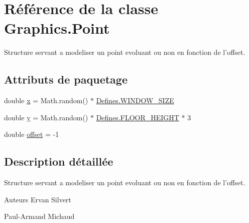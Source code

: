 \hypertarget{classGraphics_1_1Point}{\section{Référence de la classe Graphics.\-Point}
\label{classGraphics_1_1Point}
}


Structure servant a modeliser un point evoluant ou non en fonction de l'offset.  


\subsection*{Attributs de paquetage}
\begin{DoxyCompactItemize}
\item 
double \hyperlink{classGraphics_1_1Point_a58d7632eb589af219c6c4bf7c2178bd3}{x} = Math.\-random() $\ast$ \hyperlink{classDefines_aafb660e1c1534aec4d2cee6cfe57029f}{Defines.\-W\-I\-N\-D\-O\-W\-\_\-\-S\-I\-Z\-E}
\item 
double \hyperlink{classGraphics_1_1Point_abadff6ba5989616e892517ebb421440a}{y} = Math.\-random() $\ast$ \hyperlink{classDefines_a2a43fe315bf385b8693c70fbf824a3d0}{Defines.\-F\-L\-O\-O\-R\-\_\-\-H\-E\-I\-G\-H\-T} $\ast$ 3
\item 
double \hyperlink{classGraphics_1_1Point_a3612c34a8c05c76590073d9274db95b1}{offset} = -\/1
\end{DoxyCompactItemize}


\subsection{Description détaillée}
Structure servant a modeliser un point evoluant ou non en fonction de l'offset. 

\begin{DoxyAuthor}{Auteurs}
Ervan Silvert 

Paul-\/\-Armand Michaud 
\end{DoxyAuthor}



